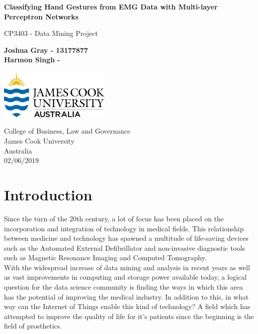 \documentclass[11pt]{article}
\begin{document}
	
	\begin{titlepage}
		\begin{center}
			\vspace*{1cm}
			
			\Huge
			\textbf{Classifying Hand Gestures from EMG Data with Multi-layer Perceptron Networks}
			
			\vspace{0.5cm}
			\LARGE
			CP3403 - Data Mining Project
			
			\vspace{1.5cm}
			
			\textbf{Joshua Gray - 13177877}\\	
			\textbf{Harmon Singh - }
			
			\vfill			
					
			\vspace{0.8cm}
			
			\includegraphics[width=0.4\textwidth]{Figures/jculogo}
			
			\Large
			College of Business, Law and Governance\\
			James Cook University\\
			Australia\\
			02/06/2019
			
		\end{center}
	\end{titlepage}
	
	\tableofcontents
	\listoffigures
	\listoftables
	\newpage
	
	\section{Introduction}
	Since the turn of the 20th century, a lot of focus has been placed on the incorporation and integration of technology in medical fields. This relationship between medicine and technology has spawned a multitude of life-saving devices such as the Automated External Defibrillator and non-invasive diagnostic tools such as Magnetic Resonance Imaging and Computed Tomography.\\
	
	\noindent	
	With the widespread increase of data mining and analysis in recent years as well as vast improvements in computing and storage power available today, a logical question for the data science community is finding the ways in which this area has the potential of improving the medical industry. In addition to this, in what way can the Internet of Things enable this kind of technology? A field which has attempted to improve the quality of life for it's patients since the beginning is the field of prosthetics.\\
	
\end{document}
